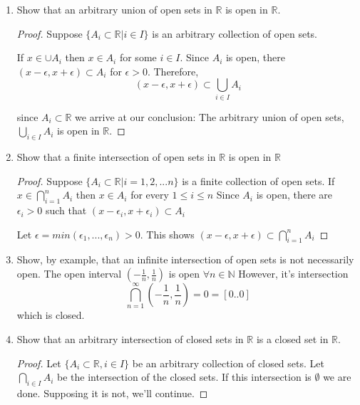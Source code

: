 \documentclass{tufte-book}
\theoremstyle{mytheoremstyle}
\theoremstyle{mylemstyle}
\theoremstyle{mydefstyle}
\begin{document}
\begin{enumerate}
\begin{proof}
\end{proof}

\item Show that an arbitrary union of open sets in $\mathbb{R}$ is open in $\mathbb{R}$.

\begin{proof}
Suppose $\{A_i \subset \mathbb{R} | i \in I\}$ is an arbitrary collection of open sets.

If $x \in \cup A_i$ then $x \in A_i$ for some $i \in I$.  Since $A_i$ is open,  there $(x - \epsilon, x+ \epsilon) \subset A_i$ for $\epsilon > 0$.  Therefore,
\[ (x-\epsilon, x+\epsilon) \subset \bigcup\limits_{i \in I}A_i \]

 since $A_i \subset \mathbb{R}$ we arrive at our conclusion: The arbitrary union of open sets, $\bigcup\limits_{i \in I}A_i$ is open in $\mathbb{R}$. 
\end{proof}

\item Show that a finite intersection of open sets in $\mathbb{R}$ is open in $\mathbb{R}$
\begin{proof}
Suppose $\{A_i \subset \mathbb{R} | i = 1,2,...n\}$ is a finite collection of open sets.  If $ x \in \bigcap\limits_{i=1}^{n} A_i $ then $x \in A_i$ for every $1 \leq i \leq n$ Since $A_i$ is open, there are $\epsilon_i > 0$  such that $(x - \epsilon_i , x+ \epsilon_i) \subset A_i$

Let $\epsilon = min(\epsilon_1,..., \epsilon_n) > 0$.  This shows $(x - \epsilon, x+ \epsilon) \subset  \bigcap\limits_{i=1}^{n} A_i $

\end{proof}

\item Show, by example, that an infinite intersection of open sets is not necessarily open.
The open interval $(- \frac{1}{n},\frac{1}{n})$ is open $\forall n \in \mathbb{N}$  However, it's intersection
\[ \bigcap\limits_{n=1}^{\infty}(- \frac{1}{n},\frac{1}{n}) = {0} = [0..0] \]
which is closed. 

\item Show that an arbitrary intersection of closed sets in $\mathbb{R}$ is a closed set in $\mathbb{R}$.
\begin{proof}

Let $\{A_i \subset \mathbb{R}, i \in I\}$ be an arbitrary collection of closed sets.   Let $\bigcap\limits_{i \in I} A_i$ be the intersection of the closed sets.  If this intersection is $\emptyset$ we are done.  Supposing it is not, we'll continue.


\end{proof}
\end{enumerate}
\end{document}
